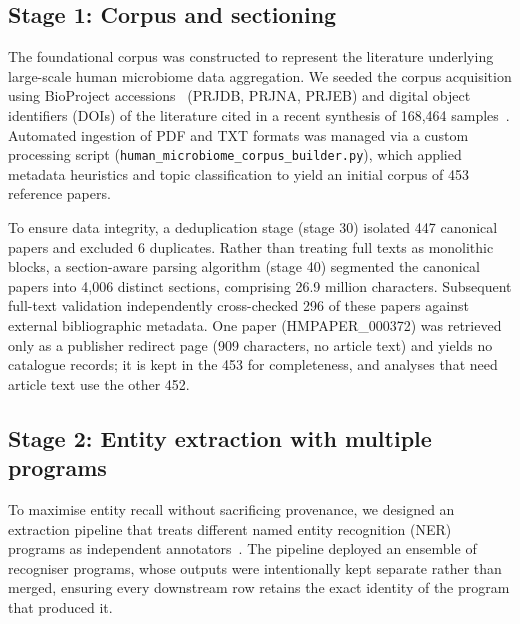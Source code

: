\documentclass[referee,lineno,pdflatex,sn-vancouver-num]{sn-jnl}
\theoremstyle{thmstyleone}%
\theoremstyle{thmstyletwo}%
\theoremstyle{thmstylethree}%
\begin{document}
\subsection{Stage 1: Corpus and sectioning}\label{sec:stage1}

The foundational corpus was constructed to represent the literature
underlying large-scale human microbiome data aggregation. We seeded the
corpus acquisition using BioProject accessions~\cite{barrett2012bioproject}
(PRJDB, PRJNA, PRJEB) and digital object identifiers (DOIs) of the
literature cited in a recent synthesis of 168,464 samples~\cite{abdill2025}.
Automated ingestion of PDF and TXT formats was managed via a custom
processing script (\texttt{human\_microbiome\_corpus\_builder.py}), which
applied metadata heuristics and topic classification to yield an initial
corpus of 453 reference papers.

To ensure data integrity, a deduplication stage (stage 30) isolated 447
canonical papers and excluded 6 duplicates. Rather than treating full texts
as monolithic blocks, a section-aware parsing algorithm (stage 40) segmented
the canonical papers into 4,006 distinct sections, comprising 26.9 million
characters. Subsequent full-text validation independently cross-checked 296
of these papers against external bibliographic metadata. One paper
(HMPAPER\_000372) was retrieved only as a publisher redirect page (909
characters, no article text) and yields no catalogue records; it is kept in
the 453 for completeness, and analyses that need article text use the other
452.

\subsection{Stage 2: Entity extraction with multiple programs}\label{sec:stage2}

To maximise entity recall without sacrificing provenance, we designed an
extraction pipeline that treats different named entity recognition (NER)
programs as independent annotators~\cite{patel2026microbialner}. The pipeline
deployed an ensemble of recogniser programs, whose outputs were intentionally
kept separate rather than merged, ensuring every downstream row retains the
exact identity of the program that produced it.
\end{document}
